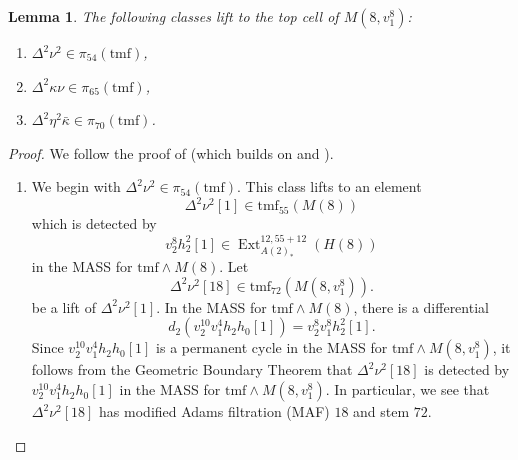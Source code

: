 \documentclass[10pt]{amsart}
\newcommand{\tmf}{\mathrm{tmf}}
\newtheorem{lem}[equation]{Lemma}
\theoremstyle{definition}
\numberwithin{equation}{section}
\numberwithin{figure}{section}
\DeclareMathOperator{\Ext}{Ext}
\begin{document}
\begin{lem}\label{Lem:v28Lift}
The following classes lift to the top cell of $M(8,v_1^8)$:
\begin{enumerate}
\item $\Delta^2 \nu^2 \in \pi_{54}(\tmf)$, 
\item $\Delta^2 \kappa \nu \in \pi_{65}(\tmf)$,  
\item $\Delta^2 \eta^2 \bar{\kappa} \in \pi_{70}(\tmf)$.
\end{enumerate}
\end{lem}

\begin{proof}
We follow the proof of \cite[Thm. 11.1]{BHHM2} (which builds on \cite[Exm. 9.5]{BHHM2} and \cite[Prop. 10.1]{BHHM2}). 


\begin{enumerate}

\item We begin with $\Delta^2 \nu^2 \in \pi_{54}(\tmf)$. This class lifts to an element 
$$\Delta^2 \nu^2[1] \in \tmf_{55}(M(8))$$
which is detected by 
$$v_2^8 h_2^2[1] \in \Ext^{12,55+12}_{A(2)_*}(H(8))$$ 
in the MASS for $\tmf \wedge M(8)$. 
Let 
$$\Delta^2 \nu^2[18] \in \tmf_{72}(M(8,v_1^8)).$$
be a lift of $\Delta^2 \nu^2[1]$. 
In the MASS for $\tmf \wedge M(8)$, there is a differential 
$$d_2(v_2^{10} v_1^4 h_2 h_0[1]) = v_2^8 v_1^8 h_2^2[1].$$
Since $v_2^{10} v_1^4 h_2 h_0[1]$ is a permanent cycle in the MASS for $\tmf \wedge M(8,v_1^8)$, it follows from the Geometric Boundary Theorem that $\Delta^2 \nu^2 [18]$ is detected by $v_2^{10} v_1^4 h_2 h_0[1]$ in the MASS for $\tmf \wedge M(8,v_1^8)$. In particular, we see that $\Delta^2 \nu^2[18]$ has modified Adams filtration (MAF) $18$ and stem $72$.


\end{enumerate}
\end{proof}
\end{document}
